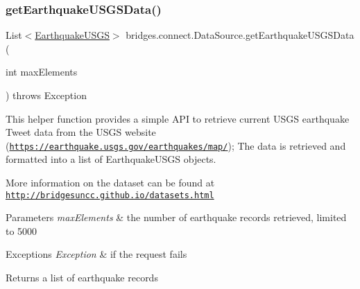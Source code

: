 \subsubsection{\texorpdfstring{get\+Earthquake\+U\+S\+G\+S\+Data()}{getEarthquakeUSGSData()}}
{\footnotesize\ttfamily List$<$\hyperlink{classbridges_1_1data__src__dependent_1_1_earthquake_u_s_g_s}{Earthquake\+U\+S\+GS}$>$ bridges.\+connect.\+Data\+Source.\+get\+Earthquake\+U\+S\+G\+S\+Data (\begin{DoxyParamCaption}\item[{int}]{max\+Elements }\end{DoxyParamCaption}) throws Exception}

This helper function provides a simple A\+PI to retrieve current U\+S\+GS earthquake Tweet data from the U\+S\+GS website (\href{https://earthquake.usgs.gov/earthquakes/map/}{\tt https\+://earthquake.\+usgs.\+gov/earthquakes/map/}); The data is retrieved and formatted into a list of Earthquake\+U\+S\+GS objects.

More information on the dataset can be found at \href{http://bridgesuncc.github.io/datasets.html}{\tt http\+://bridgesuncc.\+github.\+io/datasets.\+html}


\begin{DoxyParams}{Parameters}
{\em max\+Elements} & the number of earthquake records retrieved, limited to 5000 \\
\hline
\end{DoxyParams}

\begin{DoxyExceptions}{Exceptions}
{\em Exception} & if the request fails\\
\hline
\end{DoxyExceptions}
\begin{DoxyReturn}{Returns}
a list of earthquake records 
\end{DoxyReturn}
\mbox{\label{classbridges_1_1connect_1_1_data_source_aab78496487313576c6aec52cd43cf518}} 
